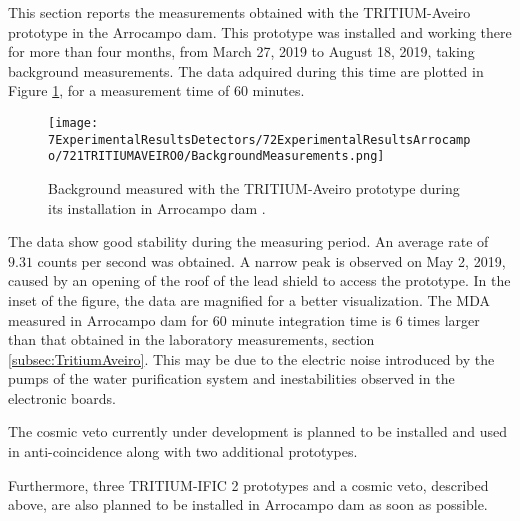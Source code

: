 This section reports the measurements obtained with the TRITIUM-Aveiro prototype in the Arrocampo dam. This prototype was installed and working there for more than four months, from March 27, 2019 to August 18, 2019, taking background measurements. The data adquired during this time are plotted in Figure \ref{fig:BackgroundArrocampoAveiro}, for a measurement time of 60 minutes.

\begin{figure}[h]
\centering
\texttt{[image: 7ExperimentalResultsDetectors/72ExperimentalResultsArrocampo/721TRITIUMAVEIRO0/BackgroundMeasurements.png]}
\caption{Background measured with the TRITIUM-Aveiro prototype during its installation in Arrocampo dam \cite{ExperimentalPaperCarlos}.\label{fig:BackgroundArrocampoAveiro}}
\end{figure}
The data show good stability during the measuring period. An average rate of $9.31$ counts per second was obtained. A narrow peak is observed on May 2, 2019, caused by an opening of the roof of the lead shield to access the prototype. In the inset of the figure, the data are magnified for a better visualization. The MDA measured in Arrocampo dam for 60 minute integration time is 6 times larger than that obtained in the laboratory measurements, section \ref{subsec:TritiumAveiro}. This may be due to the electric noise introduced by the pumps of the water purification system and inestabilities observed in the electronic boards.

The cosmic veto currently under development is planned to be installed and used in anti-coincidence along with two additional prototypes.

Furthermore, three TRITIUM-IFIC 2 prototypes and a cosmic veto, described above, are also planned to be installed in Arrocampo dam as soon as possible.